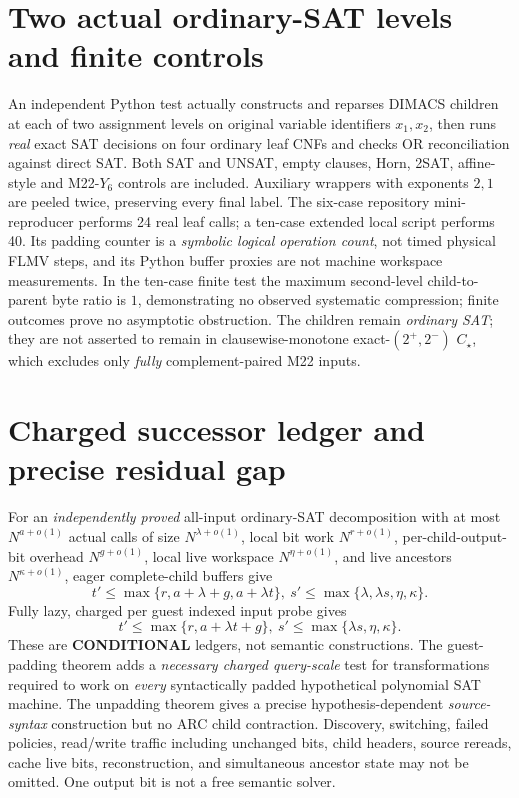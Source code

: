 \documentclass[11pt]{article}
\begin{document}
\section*{Two actual ordinary-SAT levels and finite controls}
An independent Python test actually constructs and reparses DIMACS children at each of two assignment levels on original variable identifiers \(x_1,x_2\), then runs \emph{real} exact SAT decisions on four ordinary leaf CNFs and checks OR reconciliation against direct SAT. Both SAT and UNSAT, empty clauses, Horn, 2SAT, affine-style and M22-\(Y_6\) controls are included. Auxiliary wrappers with exponents \(2,1\) are peeled twice, preserving every final label. The six-case repository mini-reproducer performs 24 real leaf calls; a ten-case extended local script performs 40. Its padding counter is a \emph{symbolic logical operation count}, not timed physical FLMV steps, and its Python buffer proxies are not machine workspace measurements. In the ten-case finite test the maximum second-level child-to-parent byte ratio is \(1\), demonstrating no observed systematic compression; finite outcomes prove no asymptotic obstruction. The children remain \emph{ordinary SAT}; they are not asserted to remain in clausewise-monotone exact-\((2^+,2^-)\) \(C_\star\), which excludes only \emph{fully} complement-paired M22 inputs.

\section*{Charged successor ledger and precise residual gap}
For an \emph{independently proved} all-input ordinary-SAT decomposition with at most \(N^{a+o(1)}\) actual calls of size \(N^{\lambda+o(1)}\), local bit work \(N^{r+o(1)}\), per-child-output-bit overhead \(N^{g+o(1)}\), local live workspace \(N^{\eta+o(1)}\), and live ancestors \(N^{\kappa+o(1)}\), eager complete-child buffers give
\[
 t'\le\max\{r,a+\lambda+g,a+\lambda t\},\
 s'\le\max\{\lambda,\lambda s,\eta,\kappa\}.
\]
Fully lazy, charged per guest indexed input probe gives
\[
 t'\le\max\{r,a+\lambda t+g\},\
 s'\le\max\{\lambda s,\eta,\kappa\}.
\]
These are \textbf{CONDITIONAL} ledgers, not semantic constructions. The guest-padding theorem adds a \emph{necessary charged query-scale} test for transformations required to work on \emph{every} syntactically padded hypothetical polynomial SAT machine. The unpadding theorem gives a precise hypothesis-dependent \emph{source-syntax} construction but no ARC child contraction. Discovery, switching, failed policies, read/write traffic including unchanged bits, child headers, source rereads, cache live bits, reconstruction, and simultaneous ancestor state may not be omitted. One output bit is not a free semantic solver.
\end{document}
